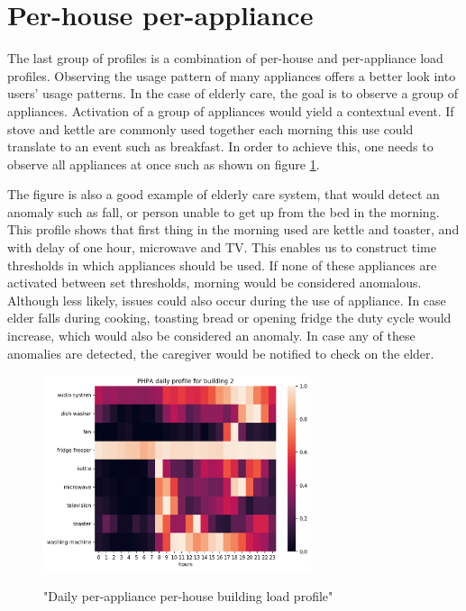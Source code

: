 \section{Per-house per-appliance}

The last group of profiles is a combination of per-house and per-appliance load profiles.
Observing the usage pattern of many appliances offers a better look into users' usage patterns.
In the case of elderly care, the goal is to observe a group of appliances.
Activation of a group of appliances would yield a contextual event.
If stove and kettle are commonly used together each morning this use could translate to an event such as breakfast. 
In order to achieve this, one needs to observe all appliances at once such as shown on figure \ref{fig:PHPA}.

The figure is also a good example of elderly care system, that would detect an anomaly such as fall, or person unable to get up from the bed in the morning.
This profile shows that first thing in the morning used are kettle and toaster, and with delay of one hour, microwave and TV. 
This enables us to construct time thresholds in which appliances should be used.
If none of these appliances are activated between set thresholds, morning would be considered anomalous.
Although less likely, issues could also occur during the use of appliance. 
In case elder falls during cooking, toasting bread or opening fridge the duty cycle would increase, which would also be considered an anomaly.
In case any of these anomalies are detected, the caregiver would be notified to check on the elder. 

\begin{figure}[H]
	\centering
	\caption{"Daily per-appliance per-house building load profile"}
	\includegraphics[width=0.7\textwidth]{../Figures/LPS/PHPA.png}
	\label{fig:PHPA}
\end{figure}

